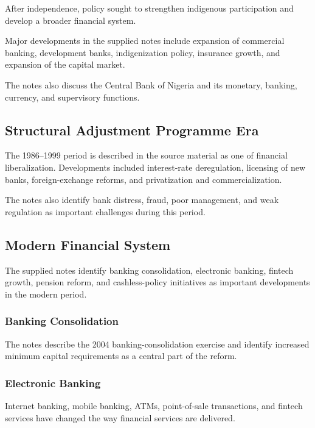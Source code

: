\documentclass[
]{article}
\begin{document}
After independence, policy sought to strengthen indigenous participation and develop a broader financial system.

Major developments in the supplied notes include expansion of commercial banking, development banks, indigenization policy, insurance growth, and expansion of the capital market.

The notes also discuss the Central Bank of Nigeria and its monetary, banking, currency, and supervisory functions.

\subsection{Structural Adjustment Programme Era}\label{structural-adjustment-programme-era}

The 1986--1999 period is described in the source material as one of financial liberalization. Developments included interest-rate deregulation, licensing of new banks, foreign-exchange reforms, and privatization and commercialization.

The notes also identify bank distress, fraud, poor management, and weak regulation as important challenges during this period.

\subsection{Modern Financial System}\label{modern-financial-system}

The supplied notes identify banking consolidation, electronic banking, fintech growth, pension reform, and cashless-policy initiatives as important developments in the modern period.

\subsubsection{Banking Consolidation}\label{banking-consolidation}

The notes describe the 2004 banking-consolidation exercise and identify increased minimum capital requirements as a central part of the reform.

\subsubsection{Electronic Banking}\label{electronic-banking}

Internet banking, mobile banking, ATMs, point-of-sale transactions, and fintech services have changed the way financial services are delivered.
\end{document}

